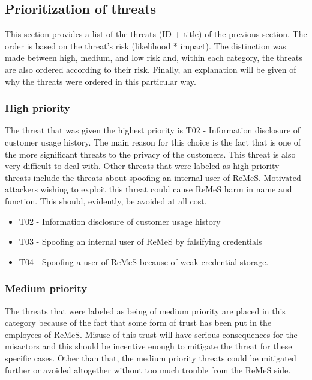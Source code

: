\subsection{Prioritization of threats}
This section provides a list of the threats (ID + title) of the previous section. The order is based on the threat's risk (likelihood * impact). The distinction was made between high, medium, and low risk and,  within each category, the threats are also ordered according to their risk.
Finally, an explanation will be given of why the threats were ordered in this particular way.

\subsubsection{High priority}
The threat that was given the highest priority is T02 - Information disclosure of customer usage history. The main reason for this choice is the fact 
that is one of the more significant threats to the privacy of the customers. This threat is also very difficult to deal with. 
Other threats that were labeled as high priority threats include the threats about spoofing an internal user of ReMeS. Motivated attackers
wishing to exploit this threat could cause ReMeS harm in name and function. This should, evidently, be avoided at all cost.


\begin{itemize}
\item T02 - Information disclosure of customer usage history
\item T03 - Spoofing an internal user of ReMeS by falsifying credentials
\item T04 - Spoofing a user of ReMeS because of weak credential storage.
\end{itemize}


\subsubsection{Medium priority}
The threats that were labeled as being of medium priority are placed in this category because of the fact that some form of trust
has been put in the employees of ReMeS. Misuse of this trust will have serious consequences for the misactors and this should 
be incentive enough to mitigate the threat for these specific cases. Other than that, the medium priority threats could be mitigated
further or avoided altogether without too much trouble from the ReMeS side.

